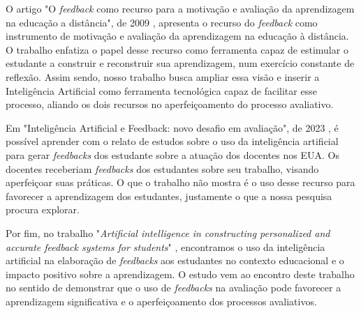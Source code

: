 O artigo "O \textit{feedback} como recurso para a motivação e
avaliação da aprendizagem na educação a
distância", de 2009 \cite{flores2009}, apresenta o recurso do \textit{feedback} como instrumento de motivação e avaliação da aprendizagem na educação à distância. O trabalho enfatiza o papel desse recurso como ferramenta capaz de estimular o estudante a construir e reconstruir sua aprendizagem, num exercício constante de reflexão. Assim sendo, nosso trabalho busca ampliar essa visão e inserir a Inteligência Artificial como ferramenta tecnológica capaz de facilitar esse processo, aliando os dois recursos no aperfeiçoamento do processo avaliativo.

Em "Inteligência Artificial e Feedback: novo desafio em avaliação", de 2023 \cite{villasboas2023}, é possível aprender com o relato de estudos sobre o uso da inteligência artificial para gerar \textit{feedbacks} dos estudante sobre a atuação dos docentes nos EUA. Os docentes receberiam \textit{feedbacks} dos estudantes sobre seu trabalho, visando aperfeiçoar suas práticas. O que o trabalho não mostra é o uso desse recurso para favorecer a aprendizagem dos estudantes, justamente o que a nossa pesquisa procura explorar.



Por fim, no trabalho "\textit{Artificial intelligence in constructing personalized and accurate feedback systems for students}" \cite{xu2023}, encontramos  o uso da inteligência artificial na elaboração de \textit{feedbacks} aos estudantes no contexto educacional e o impacto positivo sobre a aprendizagem. O estudo vem ao encontro deste trabalho no sentido de demonstrar que o uso de \textit{feedbacks} na avaliação pode favorecer a aprendizagem significativa e o aperfeiçoamento dos processos avaliativos.
